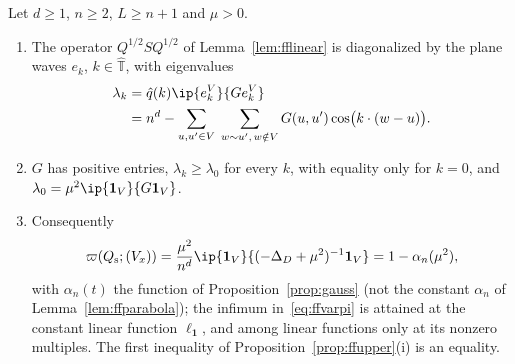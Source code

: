 \begin{theorem}\label{ffs:thm:exact}
Let $d\ge1$, $n\ge2$, $L\ge n+1$ and $\mu>0$.
\begin{enumerate}[label=\textup{(\roman*)},leftmargin=*]
\item The operator $Q^{1/2}SQ^{1/2}$ of Lemma~\ref{lem:fflinear} is
diagonalized by the plane waves $e_k$, $k\in\widehat{\mathbb T}$, with
eigenvalues
\begin{equation}\label{ffs:eq:spectrum}
\begin{split}
\lambda_k&=\hat q(k)\ip{e_k^V}{Ge_k^V}\\
&=n^d-\sum_{u,u'\in V}\;\sum_{w\sim u',\,w\notin V}G(u,u')\cos\bigl(k\cdot(w-u)
\bigr).
\end{split}
\end{equation}
\item $G$ has positive entries, $\lambda_k\ge\lambda_0$ for every $k$, with
equality only for $k=0$, and $\lambda_0=\mu^2\ip{\mathbf 1_V}{G\mathbf 1_V}$.
\item Consequently
\[
\varpi(Q_{\rm s};(V_x))=\frac{\mu^2}{n^d}\ip{\mathbf 1_V}{(-\Delta_D+\mu^2)
^{-1}\mathbf 1_V}=1-\alpha_n(\mu^2),
\]
with $\alpha_n(t)$ the function of Proposition~\textup{\ref{prop:gauss}} (not the constant $\alpha_n$ of Lemma~\textup{\ref{lem:ffparabola}}); the infimum
in~\eqref{eq:ffvarpi} is attained at the constant linear function $\ell_{
\mathbf 1}$, and among linear functions only at its nonzero multiples. The
first inequality of Proposition~\textup{\ref{prop:ffupper}(i)} is an equality.
\end{enumerate}
\end{theorem}

